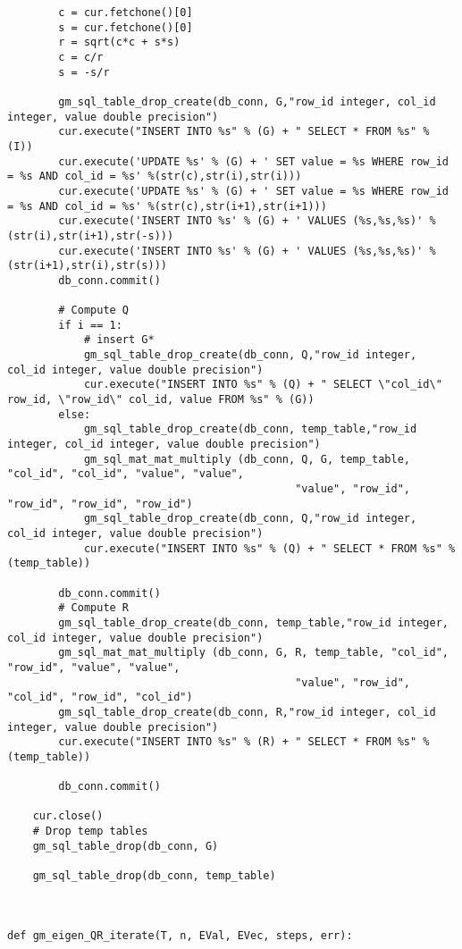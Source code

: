 \begin{lstlisting}
        c = cur.fetchone()[0]
        s = cur.fetchone()[0]
        r = sqrt(c*c + s*s)
        c = c/r
        s = -s/r

        gm_sql_table_drop_create(db_conn, G,"row_id integer, col_id integer, value double precision")
        cur.execute("INSERT INTO %s" % (G) + " SELECT * FROM %s" % (I))
        cur.execute('UPDATE %s' % (G) + ' SET value = %s WHERE row_id = %s AND col_id = %s' %(str(c),str(i),str(i)))
        cur.execute('UPDATE %s' % (G) + ' SET value = %s WHERE row_id = %s AND col_id = %s' %(str(c),str(i+1),str(i+1)))
        cur.execute('INSERT INTO %s' % (G) + ' VALUES (%s,%s,%s)' %(str(i),str(i+1),str(-s)))
        cur.execute('INSERT INTO %s' % (G) + ' VALUES (%s,%s,%s)' %(str(i+1),str(i),str(s)))
        db_conn.commit()

        # Compute Q
        if i == 1:
            # insert G*
            gm_sql_table_drop_create(db_conn, Q,"row_id integer, col_id integer, value double precision")
            cur.execute("INSERT INTO %s" % (Q) + " SELECT \"col_id\" row_id, \"row_id\" col_id, value FROM %s" % (G))
        else:
            gm_sql_table_drop_create(db_conn, temp_table,"row_id integer, col_id integer, value double precision")
            gm_sql_mat_mat_multiply (db_conn, Q, G, temp_table, "col_id", "col_id", "value", "value",
                                             "value", "row_id", "row_id", "row_id", "row_id")
            gm_sql_table_drop_create(db_conn, Q,"row_id integer, col_id integer, value double precision")
            cur.execute("INSERT INTO %s" % (Q) + " SELECT * FROM %s" % (temp_table))

        db_conn.commit()
        # Compute R
        gm_sql_table_drop_create(db_conn, temp_table,"row_id integer, col_id integer, value double precision")
        gm_sql_mat_mat_multiply (db_conn, G, R, temp_table, "col_id", "row_id", "value", "value",
                                             "value", "row_id", "col_id", "row_id", "col_id")
        gm_sql_table_drop_create(db_conn, R,"row_id integer, col_id integer, value double precision")
        cur.execute("INSERT INTO %s" % (R) + " SELECT * FROM %s" % (temp_table))

        db_conn.commit()

    cur.close()
    # Drop temp tables
    gm_sql_table_drop(db_conn, G)

    gm_sql_table_drop(db_conn, temp_table)



def gm_eigen_QR_iterate(T, n, EVal, EVec, steps, err):


\end{lstlisting}
